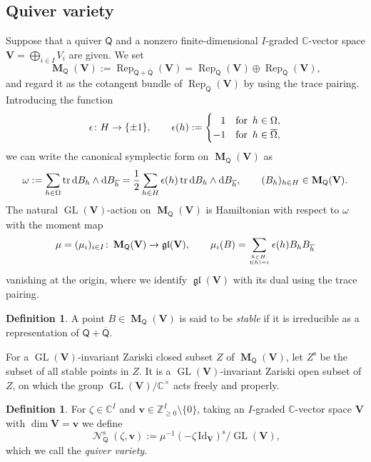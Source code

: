 \documentclass[pdftex]{sigma}
\numberwithin{equation}{section}
\theoremstyle{definition}
\newtheorem{Definition}[Theorem]{Definition}
\newcommand{\Z}{\mathbb{Z}} %
\newcommand{\C}{\mathbb{C}} %
\newcommand{\GL}{\operatorname{GL}} %
\newcommand{\gl}{\operatorname{\mathfrak{gl}}}
\newcommand{\tr}{\operatorname{tr}}
\newcommand{\unit}{\mathrm{Id}}
\newcommand{\Rep}{\operatorname{Rep}}
\newcommand{\bM}{\operatorname{\mathbf{M}}}
\newcommand{\bV}{\mathbf{V}}
\newcommand{\bv}{\mathbf{v}}
\newcommand{\ov}{\overline}
\newcommand{\st}{\mathrm{s}}
\newcommand{\sumfrac}[2]{\genfrac{}{}{0pt}{2}{#1}{#2}}
\newcommand{\hquad}{\hspace{.5em}}
\newcommand{\Qst}{\operatorname{\mathscr{N}}^\mathrm{s}}
\newcommand{\vin}{\mathsf{t}} %
\newcommand{\QQ}{\mathsf{Q}} %
\newcommand{\rd}{\mathop{\mathrm{d}\!}\mathstrut}
\begin{document}
\subsection{Quiver variety}\label{subsec:q-variety}

Suppose that a quiver $\QQ$
and a nonzero f\/inite-dimensional $I$-graded $\C$-vector space
$\bV = \bigoplus_{i \in I}V_i$ are given.
We set
\[
\bM_\QQ(\bV) := \Rep_{\QQ+\ov{\QQ}}(\bV)
= \Rep_\QQ(\bV) \oplus \Rep_{\ov{\QQ}}(\bV),
\]
and regard it as the cotangent bundle of $\Rep_\QQ(\bV)$
by using the trace pairing.
Introducing the function
\[
\epsilon \colon H \to \{ \pm 1 \}, \qquad \epsilon(h):=
\begin{cases}
\hphantom{-}1 & \text{for}\hquad h \in \Omega,\\
-1& \text{for}\hquad h \in \ov{\Omega},
\end{cases}
\]
we can write the canonical symplectic form on $\bM_\QQ(\bV)$ as
\[
\omega := \sum_{h \in \Omega} \tr \rd B_h \wedge \rd B_{\ov{h}}
= \frac12 \sum_{h \in H} \epsilon(h) \tr \rd B_h \wedge \rd B_{\ov{h}},
\qquad (B_h)_{h \in H} \in \bM_\QQ(\bV).
\]
The natural $\GL(\bV)$-action on $\bM_\QQ(\bV)$ is Hamiltonian
with respect to $\omega$ with the moment map
\begin{gather}\label{eq:moment}
\mu=(\mu_i)_{i \in I} \colon \bM_\QQ(\bV) \to \gl(\bV), \qquad
\mu_i(B)=\sum_{\sumfrac{h \in H:}{\vin(h)=i}} \epsilon (h) B_h B_{\ov h}
\end{gather}
vanishing at the origin,
where we identify $\gl(\bV)$
with its dual using the trace pairing.

\begin{Definition}\label{dfn:stable}
A point $B \in \bM_\QQ(\bV)$ is said to be {\em stable}
if it is irreducible as a representation of $\QQ + \ov{\QQ}$.
\end{Definition}

For a $\GL(\bV)$-invariant Zariski closed subset $Z$ of $\bM_\QQ(\bV)$,
let $Z^\st$ be the subset of all stable points in $Z$.
It is a $\GL(\bV)$-invariant Zariski open subset of $Z$,
on which the group $\GL(\bV)/\C^\times$ acts
freely and properly.

\begin{Definition}\label{dfn:q-variety}
For $\zeta \in \C^I$ and $\bv \in \Z_{\geq 0}^I \setminus \{ 0 \}$,
taking an $I$-graded $\C$-vector space $\bV$ with $\dim \bV = \bv$
we def\/ine
\[
\Qst_\QQ(\zeta,\bv) := \mu^{-1}(-\zeta\,\unit_\bV)^\st / \GL(\bV),
\]
which we call the {\em quiver variety}.
\end{Definition}
\end{document}
